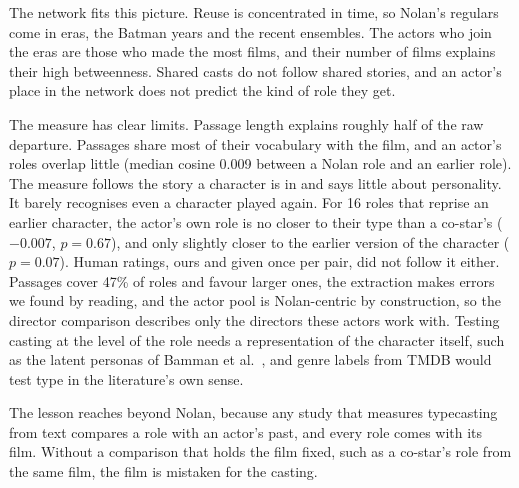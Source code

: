 \documentclass[9pt,twocolumn,twoside]{pnas-new}
\begin{document}
The network fits this picture. Reuse is concentrated in time, so Nolan's regulars come in eras, the Batman years and the recent ensembles. The actors who join the eras are those who made the most films, and their number of films explains their high betweenness. Shared casts do not follow shared stories, and an actor's place in the network does not predict the kind of role they get.

The measure has clear limits. Passage length explains roughly half of the raw departure. Passages share most of their vocabulary with the film, and an actor's roles overlap little (median cosine 0.009 between a Nolan role and an earlier role). The measure follows the story a character is in and says little about personality. It barely recognises even a character played again. For 16 roles that reprise an earlier character, the actor's own role is no closer to their type than a co-star's ($-0.007$, $p = 0.67$), and only slightly closer to the earlier version of the character ($p = 0.07$). Human ratings, ours and given once per pair, did not follow it either. Passages cover 47\% of roles and favour larger ones, the extraction makes errors we found by reading, and the actor pool is Nolan-centric by construction, so the director comparison describes only the directors these actors work with. Testing casting at the level of the role needs a representation of the character itself, such as the latent personas of Bamman et al.\ \cite{bamman2013}, and genre labels from TMDB would test type in the literature's own sense.

The lesson reaches beyond Nolan, because any study that measures typecasting from text compares a role with an actor's past, and every role comes with its film. Without a comparison that holds the film fixed, such as a co-star's role from the same film, the film is mistaken for the casting.
\end{document}
